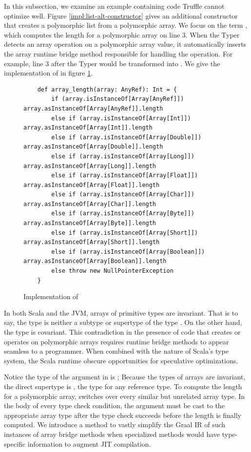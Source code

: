 In this subsection, we examine an example containing code Truffle cannot optimize well.
Figure \ref{impl:list-alt-constructor} gives an additional constructor that creates a polymorphic list from a polymorphic array.
We focus on the term , which computes the length for a polymorphic array on line $3$.
When the Typer detects an array operation on a polymorphic array value, it automatically inserts the array runtime bridge method responsible for handling the operation.
For example, line $3$ after the Typer would be transformed into .
We give the implementation of  in figure \ref{impl:array-length}.

\begin{figure}[!htb]
	\begin{verbatim}
	def array_length(array: AnyRef): Int = {
		if (array.isInstanceOf[Array[AnyRef]])       array.asInstanceOf[Array[AnyRef]].length
		else if (array.isInstanceOf[Array[Int]])     array.asInstanceOf[Array[Int]].length
		else if (array.isInstanceOf[Array[Double]])  array.asInstanceOf[Array[Double]].length
		else if (array.isInstanceOf[Array[Long]])    array.asInstanceOf[Array[Long]].length
		else if (array.isInstanceOf[Array[Float]])   array.asInstanceOf[Array[Float]].length
		else if (array.isInstanceOf[Array[Char]])    array.asInstanceOf[Array[Char]].length
		else if (array.isInstanceOf[Array[Byte]])    array.asInstanceOf[Array[Byte]].length
		else if (array.isInstanceOf[Array[Short]])   array.asInstanceOf[Array[Short]].length
		else if (array.isInstanceOf[Array[Boolean]]) array.asInstanceOf[Array[Boolean]].length
		else throw new NullPointerException
	}
	\end{verbatim}
	\caption{Implementation of }
	\label{impl:array-length}
\end{figure}

In both Scala and the JVM, arrays of primitive types are invariant.
That is to say, the type  is neither a subtype or supertype of the type .
On the other hand, the type  is covariant.
This contradiction in the presence of code that creates or operates on polymorphic arrays requires runtime bridge methods to appear seamless to a programmer.
When combined with the nature of Scala's type system, the Scala runtime obscure opportunities for speculative optimizations.

Notice the type of the argument in  is ; Because the types of arrays are invariant, the direct supertype is , the type for any reference type.
To compute the length for a polymorphic array,  switches over every similar but unrelated array type.
In the body of every type check condition, the argument must be cast to the appropriate array type after the type check succeeds before the length is finally computed.
We introduce a method to vastly simplify the Graal IR of such instances of array bridge methods when specialized methods would have type-specific information to augment JIT compilation.

